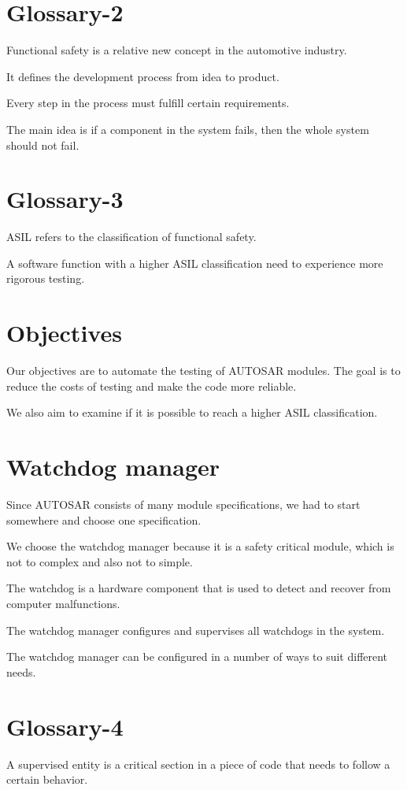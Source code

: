 \documentclass[a4paper]{article}
\begin{document}
\section{Glossary-2}
Functional safety is a relative new concept in the automotive
industry.

It defines the development process from idea to product.

Every step in the process must fulfill certain requirements.

The main idea is if a component in the system fails, then the whole
system should not fail.

\section{Glossary-3}
ASIL refers to the classification of functional safety.

A software function with a higher ASIL classification need to
experience more rigorous testing.

\section{Objectives}
Our objectives are to automate the testing of AUTOSAR modules. The
goal is to reduce the costs of testing and make the code more
reliable.

We also aim to examine if it is possible to reach a higher ASIL classification.

\section{Watchdog manager}
Since AUTOSAR consists of many module specifications, we had to start
somewhere and choose one specification.

We choose the watchdog manager because it is a safety critical module,
which is not to complex and also not to simple.

The watchdog is a hardware component that is used to detect and
recover from computer malfunctions.

The watchdog manager configures and supervises all watchdogs in the
system.

The watchdog manager can be configured in a number of ways to suit
different needs.

\section{Glossary-4}
A supervised entity is a critical section in a piece of code that
needs to follow a certain behavior.
\end{document}
